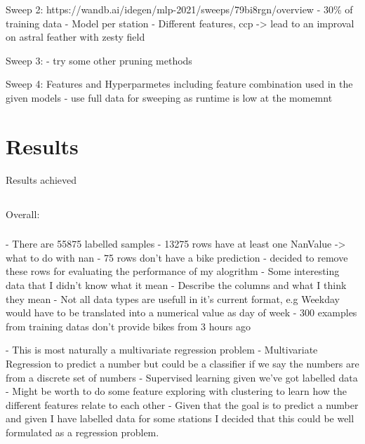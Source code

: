 \documentclass{article}
\begin{document}
{{{{{{        Sweep 2: https://wandb.ai/idegen/mlp-2021/sweeps/79bi8rgn/overview
            - 30\% of training data
            - Model per station
            - Different features, ccp
            -> lead to an improval on astral feather with zesty field

        Sweep 3:
            - try some other pruning methods

        Sweep 4: Features and Hyperparmetes including feature combination used in the given models
            - use full data for sweeping as runtime is low at the momemnt

        \section{Results}\label{sec:results}
        Results achieved

        \subsection*{}
        Overall:

        \subsubsection*{}
        - There are 55875 labelled samples
        - 13275 rows have at least one NanValue -> what to do with nan
        - 75 rows don't have a bike prediction - decided to remove these rows for evaluating the performance of my alogrithm
        - Some interesting data that I didn't know what it mean
        - Describe the columns and what I think they mean
        - Not all data types are usefull in it's current format, e.g Weekday would have to be translated into a numerical value as day of week
        - 300 examples from training datas don't provide bikes from 3 hours ago

        - This is most naturally a multivariate regression problem
        - Multivariate Regression to predict a number but could be a classifier if we say the numbers are from a discrete set of numbers
        - Supervised learning given we've got labelled data
        - Might be worth to do some feature exploring with clustering to learn how the different features relate to each other
        - Given that the goal is to predict a number and given I have labelled data for some stations I decided that this could be
            well formulated as a regression problem.

}}}}}}
\end{document}
